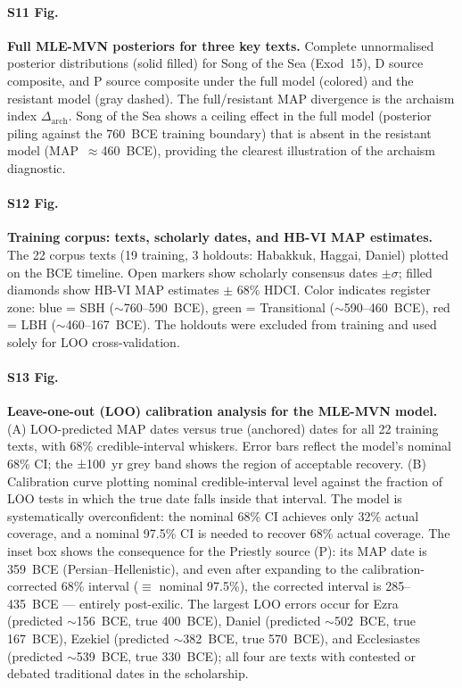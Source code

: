 \documentclass[10pt,letterpaper]{article}
\begin{document}
\paragraph*{S11 Fig.}
\label{S11_Fig}
\textbf{Full MLE-MVN posteriors for three key texts.}
Complete unnormalised posterior distributions (solid filled) for Song of
the Sea (Exod~15), D source composite, and P source composite under the
full model (colored) and the resistant model (gray dashed).  The
full/resistant MAP divergence is the archaism index $\Delta_{\text{arch}}$.
Song of the Sea shows a ceiling effect in the full model (posterior piling
against the 760~BCE training boundary) that is absent in the resistant
model (MAP~$\approx$460~BCE), providing the clearest illustration of the
archaism diagnostic.

\paragraph*{S12 Fig.}
\label{S12_Fig}
\textbf{Training corpus: texts, scholarly dates, and HB-VI MAP estimates.}
The 22 corpus texts (19 training, 3 holdouts: Habakkuk, Haggai, Daniel) plotted on
the BCE timeline.  Open markers show scholarly consensus dates $\pm\sigma$; filled
diamonds show HB-VI MAP estimates $\pm$ 68\% HDCI.  Color indicates register zone:
blue = SBH ($\sim$760--590~BCE), green = Transitional ($\sim$590--460~BCE),
red = LBH ($\sim$460--167~BCE).  The holdouts were excluded from training and used
solely for LOO cross-validation.

\paragraph*{S13 Fig.}
\label{S13_Fig}
\textbf{Leave-one-out (LOO) calibration analysis for the MLE-MVN model.}
(A) LOO-predicted MAP dates versus true (anchored) dates for all 22 training texts,
with 68\% credible-interval whiskers.  Error bars reflect the model's nominal 68\% CI;
the ±100~yr grey band shows the region of acceptable recovery.
(B) Calibration curve plotting nominal credible-interval level against the fraction of
LOO tests in which the true date falls inside that interval.  The model is systematically
overconfident: the nominal 68\% CI achieves only 32\% actual coverage, and a nominal
97.5\% CI is needed to recover 68\% actual coverage.  The inset box shows the
consequence for the Priestly source (P): its MAP date is 359~BCE (Persian--Hellenistic),
and even after expanding to the calibration-corrected 68\% interval ($\equiv$ nominal
97.5\%), the corrected interval is 285--435~BCE --- entirely post-exilic.
The largest LOO errors occur for Ezra (predicted $\sim$156~BCE, true 400~BCE),
Daniel (predicted $\sim$502~BCE, true 167~BCE), Ezekiel (predicted $\sim$382~BCE, true
570~BCE), and Ecclesiastes (predicted $\sim$539~BCE, true 330~BCE); all four are texts
with contested or debated traditional dates in the scholarship.
\end{document}
